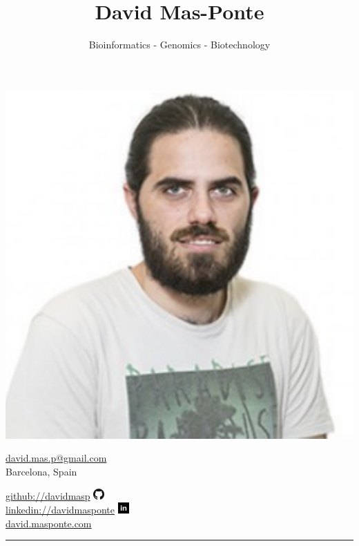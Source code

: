 \documentclass[10pt,a4paper]{article} %
\title{\bfseries\Huge David Mas-Ponte}
\author{Bioinformatics - Genomics - Biotechnology}
\date{}
\begin{document}
\begin{minipage}[c]{0.65\textwidth}
\maketitle
\end{minipage}
\begin{minipage}[c]{0.3\textwidth}
  \includegraphics[width=.55\textwidth]{profile}
\end{minipage}


\begin{minipage}[c]{0.65\textwidth}
  \begin{center}
    \href{mailto:david.mas.p@gmail.com}{david.mas.p@gmail.com}\\
    Barcelona, Spain
  \end{center}
\end{minipage}
\begin{minipage}[c]{0.3\textwidth}
\href{https://github.com/davidmasp}{github://davidmasp}
\includegraphics[height=12pt]{gh}\\
\href{https://www.linkedin.com/in/davidmasponte/}{linkedin://davidmasponte}
\includegraphics[height=12pt]{in}\\
\href{http://david.masponte.com/}{david.masponte.com}
\end{minipage}


\vspace{0.75cm}
\rule{.95\textwidth}{0.6pt}

\end{document}

